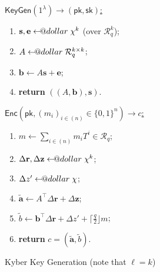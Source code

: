 \documentclass{template}
\makeatletter
\newcommand\leftarrowS{\leftarrow\joinrel\smalldollar}
\newcommand{\smalldollar}{\mathrel{\mathpalette\small@dollar\relax}}
\newcommand{\small@dollar}[2]{%
  \vcenter{\hbox{%
    $#1\textnormal{\fontsize{0.7\dimexpr\f@size pt}{0}\selectfont\$}$%
  }}%
}
\makeatother
\begin{document}
\begin{figure}[ht]
\centering
\footnotesize 

\begin{minipage}[t]{0.32\linewidth}
    \begin{mdframed}[linecolor=black, linewidth=1.0pt,
                     skipabove=5pt, skipbelow=5pt,
                     innerleftmargin=5pt, innerrightmargin=5pt]
        \centering
        \colorbox{purple!10}{\underline{$\mathsf{KeyGen}(1^{\lambda}) \to (\mathsf{pk},\mathsf{sk})$:}}
        \begin{enumerate}
            \item $\mathbf{s},\mathbf{e} \leftarrowS \chi^k$ (over $\mathcal{R}_q^k$);
            \item $A \leftarrowS \mathcal{R}_q^{k \times k}$;
            \item $\mathbf{b} \gets A\mathbf{s} + \mathbf{e}$;
            \item \textbf{return} $((A,\mathbf{b}),\mathbf{s})$.
        \end{enumerate}
    \end{mdframed}
    \caption{Kyber Key Generation (note that $\ell=k$)}
    \label{fig:kyber-keygen}
\end{minipage}
\hfill
\begin{minipage}[t]{0.32\linewidth}
    \begin{mdframed}[linecolor=black, linewidth=1.0pt,
                     skipabove=5pt, skipbelow=5pt,
                     innerleftmargin=5pt, innerrightmargin=5pt]
        \centering
        \colorbox{green!10}{\underline{$\mathsf{Enc}(\mathsf{pk}, (m_i)_{i \in (n)} \in \{0,1\}^n) \to c$:}}
        \begin{enumerate}
            \item $m \gets \sum_{i \in (n)}m_iT^i \in \mathcal{R}_q$;
            \item $\Delta \mathbf{r}, \Delta \mathbf{z} \leftarrowS \chi^k$;
            \item $\Delta z' \leftarrowS \chi$;
            \item $\widetilde{\mathbf{a}} \gets A^{\top}\Delta\mathbf{r} + \Delta\mathbf{z}$;
            \item $\widetilde{b} \gets \mathbf{b}^{\top}\Delta \mathbf{r} + \Delta z' + \lceil \frac{q}{2} \rfloor m$;
            \item \textbf{return} $c=(\widetilde{\mathbf{a}}, \widetilde{b})$.
        \end{enumerate}
    \end{mdframed}

\end{minipage}
\end{figure}
\end{document}
